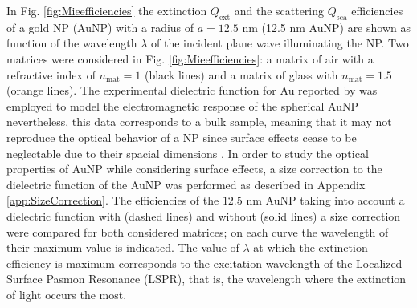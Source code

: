 In Fig. \ref{fig:Mieefficiencies} the extinction  $Q_\text{ext}$ and the scattering  $Q_\text{sca}$ efficiencies of a gold NP (AuNP) with a radius of $a = 12.5$ nm (12.5 nm AuNP) are shown as function of the wavelength $\lambda$ of the incident plane wave illuminating the NP. Two matrices were considered in Fig. \ref{fig:Mieefficiencies}: a matrix of air with a refractive index of $n_\text{mat} = 1$ (black lines) and a matrix of glass with $n_\text{mat} = 1.5$ (orange lines).  The experimental dielectric function for Au reported by \citeauthor{johnson_optical_1972} \cite{johnson_optical_1972}  was employed to model the electromagnetic response of the spherical AuNP nevertheless, this data corresponds to a bulk sample, meaning that it may not reproduce the optical behavior of a NP since surface effects cease to be neglectable  due to their spacial dimensions \cite{noguez_surface_2007}.   In order to study  the optical properties of AuNP while considering  surface effects,  a size correction to the dielectric function of the AuNP was performed as described in Appendix \ref{app:SizeCorrection}. The efficiencies of the $12.5$ nm AuNP  taking into account a dielectric function with (dashed lines) and without (solid lines) a size correction were compared for both considered matrices; on each curve the wavelength of their maximum value is indicated. The value of $\lambda$ at which the extinction efficiency is maximum corresponds to the excitation wavelength of the Localized Surface Pasmon Resonance (LSPR), that is, the wavelength where the extinction of light occurs the most.

